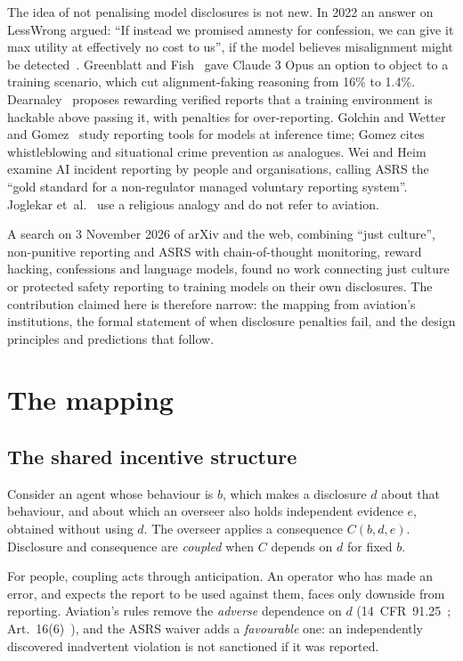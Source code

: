\documentclass[review,12pt]{elsarticle}
\begin{document}
The idea of not penalising model disclosures is not new. In 2022 an answer on LessWrong argued: ``If instead we promised amnesty for confession, we can give it max utility at effectively no cost to us'', if the model believes misalignment might be detected~\cite{makoyass2022}. Greenblatt and Fish~\cite{greenblatt2025} gave Claude 3 Opus an option to object to a training scenario, which cut alignment-faking reasoning from 16\% to 1.4\%. Dearnaley~\cite{dearnaley2026} proposes rewarding verified reports that a training environment is hackable above passing it, with penalties for over-reporting. Golchin and Wetter~\cite{golchin2026} and Gomez~\cite{gomez2026} study reporting tools for models at inference time; Gomez cites whistleblowing and situational crime prevention as analogues. Wei and Heim~\cite{weiheim2026} examine AI incident reporting by people and organisations, calling ASRS the ``gold standard for a non-regulator managed voluntary reporting system''. Joglekar et~al.~\cite{joglekar2025} use a religious analogy and do not refer to aviation.

A search on 3 November 2026 of arXiv and the web, combining ``just culture'', non-punitive reporting and ASRS with chain-of-thought monitoring, reward hacking, confessions and language models, found no work connecting just culture or protected safety reporting to training models on their own disclosures. The contribution claimed here is therefore narrow: the mapping from aviation's institutions, the formal statement of when disclosure penalties fail, and the design principles and predictions that follow.

\section{The mapping}\label{sec:mapping}

\subsection{The shared incentive structure}\label{sec:incentive}

Consider an agent whose behaviour is \(b\), which makes a disclosure \(d\) about that behaviour, and about which an overseer also holds independent evidence \(e\), obtained without using \(d\). The overseer applies a consequence \(C(b, d, e)\). Disclosure and consequence are \emph{coupled} when \(C\) depends on \(d\) for fixed \(b\).

For people, coupling acts through anticipation. An operator who has made an error, and expects the report to be used against them, faces only downside from reporting. Aviation's rules remove the \emph{adverse} dependence on \(d\) (14~CFR~91.25~\cite{cfr9125}; Art.~16(6)~\cite{eu376}), and the ASRS waiver adds a \emph{favourable} one: an independently discovered inadvertent violation is not sanctioned if it was reported.
\end{document}
